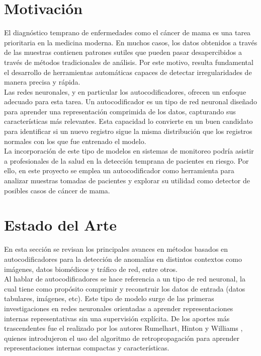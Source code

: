 \documentclass[a4paper,10pt]{book}
\begin{document}
\section{Motivación}

El diagnóstico temprano de enfermedades como el cáncer de mama es una tarea prioritaria en la medicina moderna. En muchos casos, los datos obtenidos a través de las muestras contienen patrones sutiles que pueden pasar desapercibidos a través de métodos tradicionales de análisis. Por este motivo, resulta fundamental el desarrollo de herramientas automáticas capaces de detectar irregularidades de manera precisa y rápida.\\

Las redes neuronales, y en particular los autocodificadores, ofrecen un enfoque adecuado para esta tarea. Un autocodificador es un tipo de red neuronal diseñado para aprender una representación comprimida de los datos, capturando sus características más relevantes. Esta capacidad lo convierte en un buen candidato para identificar si un nuevo registro sigue la misma distribución que los registros normales con los que fue entrenado el modelo.\\

La incorporación de este tipo de modelos en sistemas de monitoreo podría asistir a profesionales de la salud en la detección temprana de pacientes en riesgo. Por ello, en este proyecto se emplea un autocodificador como herramienta para analizar muestras tomadas de pacientes y explorar su utilidad como detector de posibles casos de cáncer de mama.

\section{Estado del Arte}

En esta sección se revisan los principales avances en métodos basados en autocodificadores para la detección de anomalías en distintos contextos como imágenes, datos biomédicos y tráfico de red, entre otros.\\

Al hablar de autocodificadores se hace referencia a un tipo de red neuronal, la cual tiene como propósito comprimir y reconstruir los datos de entrada (datos tabulares, imágenes, etc). Este tipo de modelo surge de las primeras investigaciones en redes neuronales orientadas a aprender representaciones internas representativas sin una supervisión explícita. De los aportes más trascendentes fue el realizado por los autores Rumelhart, Hinton y Williams \cite{ggcs1986learning}, quienes introdujeron el uso del algoritmo de retropropagación para aprender representaciones internas compactas y características.
\end{document}
